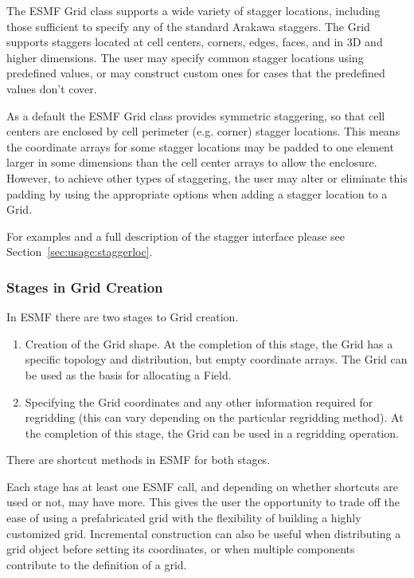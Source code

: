 The ESMF Grid class supports a wide variety of stagger locations, including
those sufficient to specify any of the standard Arakawa staggers. The 
Grid supports staggers located at cell centers, corners, edges, 
faces, and in 3D and higher dimensions. The user may specify
common stagger locations using predefined values, or may construct
custom ones for cases that the predefined values don't cover.

As a default the ESMF Grid class provides symmetric staggering, so
that cell centers are enclosed by cell perimeter (e.g. corner) 
stagger locations. This means the coordinate arrays for
some stagger locations may be padded to one element larger in some
dimensions than the cell center arrays to allow the enclosure. 
However, to achieve other types of staggering, the user may alter 
or eliminate this padding by using the appropriate options when adding
a stagger location to a Grid. 
 
For examples and a full description of the stagger interface 
please see Section~\ref{sec:usage:staggerloc}. 

\subsubsection{Stages in Grid Creation} 

In ESMF there are two stages to Grid creation.
\begin{enumerate}
\item Creation of the Grid shape.  At the completion of this
stage, the Grid has a specific topology and distribution, but
empty coordinate arrays.  The Grid can be used as the basis for
allocating a Field.
\item Specifying the Grid coordinates and any other information
required for regridding (this can vary depending on the particular
regridding method).  At the completion of this stage, the Grid can
be used in a regridding operation.
\end{enumerate}
There are shortcut methods in ESMF for both stages.

Each stage has at least one ESMF call, and depending on 
whether shortcuts are used or not, may have more.
This gives the user the opportunity to trade off the 
ease of using a prefabricated grid with the flexibility 
of building a highly customized grid.  Incremental
construction can also be useful when distributing a grid object
before setting its coordinates, or when multiple components
contribute to the definition of a grid. 

